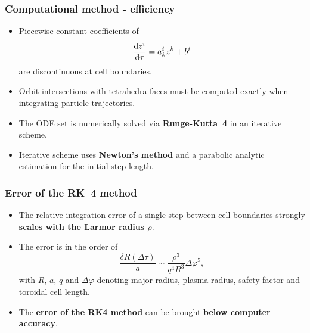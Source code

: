 \documentclass{beamer}
\newcommand{\be}[1]{\begin{equation} \label{#1}}
\newcommand{\ee}{\end{equation}}
\newcommand{\rd}{{\rm d}}
\begin{document}
\begin{frame}
\frametitle{Computational method - efficiency}
\vspace{-0.5cm}
\begin{itemize}
	\item Piecewise-constant coefficients of 
	$$
	\frac{\rd z^i}{\rd \tau} = a^i_k z^k + b^i
	$$
	are discontinuous at cell boundaries. 
	\item Orbit intersections with tetrahedra faces must be computed exactly when integrating particle trajectories.
	
	\item The ODE set is numerically solved via \textbf{Runge-Kutta~4} in an iterative scheme.
	\item Iterative scheme uses \textbf{Newton's method} and a parabolic analytic estimation for the  initial step length.
\end{itemize}
\end{frame}

\begin{frame}
\frametitle{Error of the RK~4 method}
\vspace{-0.5cm}
\begin{itemize}
	\item The relative integration error of a single step between cell boundaries strongly \textbf{scales with the Larmor radius $\rho$}.
	
	\item The error is in the order of
	\be{RK4estimation}
	\frac{\delta R(\Delta\tau)}{a} \sim \frac{\rho^3}{q^4 R^3} \Delta \varphi^5,
	\ee
	with $R$, $a$, $q$ and $\Delta\varphi$ denoting major radius, plasma radius, safety factor and toroidal cell length.
	
	\item 
	The \textbf{error of the RK4 method} can be brought \textbf{below computer accuracy}.
\end{itemize}
\end{frame}
\end{document}
